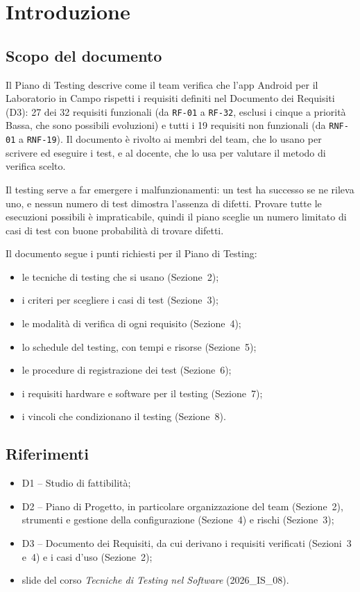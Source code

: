 \section{Introduzione}

\subsection{Scopo del documento}

Il Piano di Testing descrive come il team verifica che l'app Android per il Laboratorio in Campo rispetti i requisiti definiti nel Documento dei Requisiti (D3): 27 dei 32 requisiti funzionali (da \texttt{RF-01} a \texttt{RF-32}, esclusi i cinque a priorità Bassa, che sono possibili evoluzioni) e tutti i 19 requisiti non funzionali (da \texttt{RNF-01} a \texttt{RNF-19}). Il documento è rivolto ai membri del team, che lo usano per scrivere ed eseguire i test, e al docente, che lo usa per valutare il metodo di verifica scelto.

Il testing serve a far emergere i malfunzionamenti: un test ha successo se ne rileva uno, e nessun numero di test dimostra l'assenza di difetti. Provare tutte le esecuzioni possibili è impraticabile, quindi il piano sceglie un numero limitato di casi di test con buone probabilità di trovare difetti.

Il documento segue i punti richiesti per il Piano di Testing:
\begin{itemize}
    \item le tecniche di testing che si usano (Sezione~2);
    \item i criteri per scegliere i casi di test (Sezione~3);
    \item le modalità di verifica di ogni requisito (Sezione~4);
    \item lo schedule del testing, con tempi e risorse (Sezione~5);
    \item le procedure di registrazione dei test (Sezione~6);
    \item i requisiti hardware e software per il testing (Sezione~7);
    \item i vincoli che condizionano il testing (Sezione~8).
\end{itemize}

\subsection{Riferimenti}

\begin{itemize}
    \item D1 -- Studio di fattibilità;
    \item D2 -- Piano di Progetto, in particolare organizzazione del team (Sezione~2), strumenti e gestione della configurazione (Sezione~4) e rischi (Sezione~3);
    \item D3 -- Documento dei Requisiti, da cui derivano i requisiti verificati (Sezioni~3 e~4) e i casi d'uso (Sezione~2);
    \item slide del corso \emph{Tecniche di Testing nel Software} (2026\_IS\_08).
\end{itemize}

